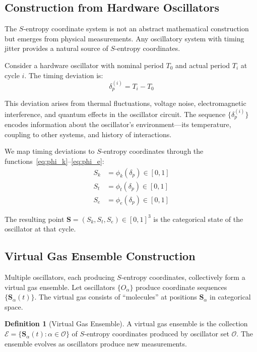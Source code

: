 \documentclass[twocolumn,showpacs,preprintnumbers,amsmath,amssymb,prd]{revtex4-2}
\theoremstyle{definition}
\newtheorem{definition}[theorem]{Definition}
\theoremstyle{remark}
\newcommand{\Sk}{S_k}
\newcommand{\St}{S_t}
\newcommand{\Se}{S_e}
\newcommand{\Scoord}{\mathbf{S}}
\begin{document}
\subsection{Construction from Hardware Oscillators}

The $S$-entropy coordinate system is not an abstract mathematical construction but emerges from physical measurements. Any oscillatory system with timing jitter provides a natural source of $S$-entropy coordinates.

Consider a hardware oscillator with nominal period $T_0$ and actual period $T_i$ at cycle $i$. The timing deviation is:
\begin{equation}
\delta_p^{(i)} = T_i - T_0
\label{eq:timing_deviation}
\end{equation}

This deviation arises from thermal fluctuations, voltage noise, electromagnetic interference, and quantum effects in the oscillator circuit. The sequence $\{\delta_p^{(i)}\}$ encodes information about the oscillator's environment---its temperature, coupling to other systems, and history of interactions.

We map timing deviations to $S$-entropy coordinates through the functions~\eqref{eq:phi_k}--\eqref{eq:phi_e}:
\begin{align}
\Sk &= \phi_k(\delta_p) \in [0, 1] \\
\St &= \phi_t(\delta_p) \in [0, 1] \\
\Se &= \phi_e(\delta_p) \in [0, 1]
\end{align}

The resulting point $\Scoord = (\Sk, \St, \Se) \in [0,1]^3$ is the categorical state of the oscillator at that cycle.

\subsection{Virtual Gas Ensemble Construction}

Multiple oscillators, each producing $S$-entropy coordinates, collectively form a virtual gas ensemble. Let oscillators $\{O_\alpha\}$ produce coordinate sequences $\{\Scoord_\alpha(t)\}$. The virtual gas consists of ``molecules'' at positions $\Scoord_\alpha$ in categorical space.

\begin{definition}[Virtual Gas Ensemble]
\label{def:virtual_gas}
A virtual gas ensemble is the collection $\mathcal{E} = \{\Scoord_\alpha(t) : \alpha \in \mathcal{O}\}$ of $S$-entropy coordinates produced by oscillator set $\mathcal{O}$. The ensemble evolves as oscillators produce new measurements.
\end{definition}
\end{document}
